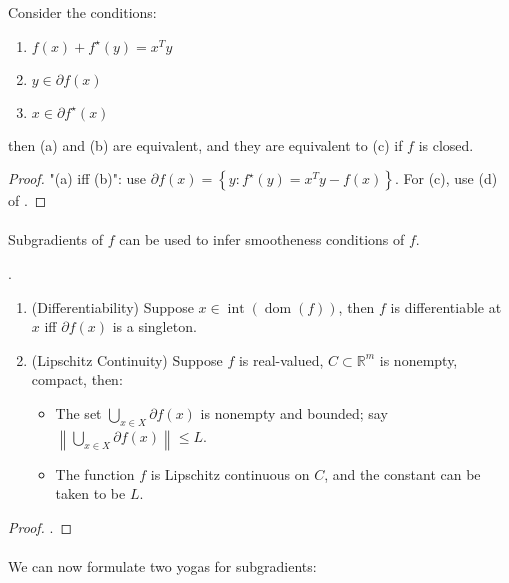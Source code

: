 \begin{prop}\label{prop:046-subgrad-conjugate}
	Consider the conditions:
	\begin{enumerate}[label=(\alph*)]
		\item $f(x) + f^\star(y) = x^Ty$
		\item $y\in \partial f(x)$
		\item $x\in \partial f^\star(x)$
	\end{enumerate}
	then (a) and (b) are equivalent, and they are equivalent to (c) if $f$ is closed.
\end{prop}

\begin{proof}
	"(a) iff (b)": use $\partial f(x) = \left\{y:f^\star(y)=x^Ty-f(x)\right\}$. For (c), use (d) of .
\end{proof}

\paragraph{}Subgradients of $f$ can be used to infer smootheness conditions of $f$.

\begin{prop}\label{prop:046-subgradients-and-smoothness}.
	\begin{enumerate}[label=(\alph*)]
		\item (Differentiability) Suppose $x\in \operatorname{int}(\operatorname{dom}(f))$, then $f$ is differentiable at $x$ iff $\partial f(x)$ is a singleton.
		\item (Lipschitz Continuity) Suppose $f$ is real-valued, $C\subset \mathbb{R}^m$ is nonempty, compact, then:
		      \begin{itemize}
			      \item The set $\bigcup_{x\in X}\partial f(x)$ is nonempty and bounded; say $\left\|\bigcup_{x\in X}\partial f(x)\right\|\leq L$.
			      \item The function $f$ is Lipschitz continuous on $C$, and the constant can be taken to be $L$.
		      \end{itemize}
	\end{enumerate}
\end{prop}
\begin{proof}
	.
\end{proof}

\paragraph{}We can now formulate two yogas for subgradients:

